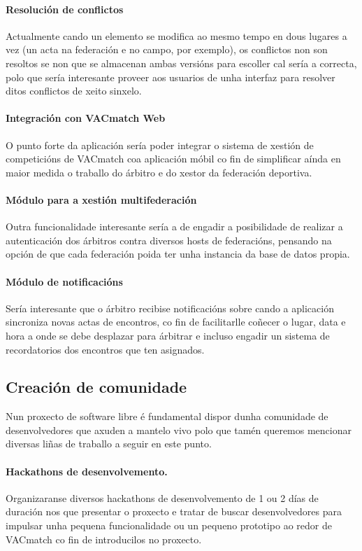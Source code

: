     \paragraph{Resolución de conflictos} Actualmente cando un elemento se 
modifica ao mesmo tempo en dous lugares a vez (un acta na federación e no 
campo, por exemplo), os conflictos non son resoltos se non que se almacenan 
ambas versións para escoller cal sería a correcta, polo que sería interesante 
proveer aos usuarios de unha interfaz para resolver ditos conflictos de xeito 
sinxelo.

    \paragraph{Integración con VACmatch Web} O punto forte da aplicación sería 
poder integrar o sistema de xestión de competicións de VACmatch coa aplicación 
móbil co fin de simplificar aínda en maior medida o traballo do árbitro e do 
xestor da federación deportiva. 

    \paragraph{Módulo para a xestión multifederación} Outra funcionalidade 
interesante sería a de engadir a posibilidade de realizar a autenticación dos 
árbitros contra diversos hosts de federacións, pensando na opción de que cada 
federación poida ter unha instancia da base de datos propia.

    \paragraph{Módulo de notificacións} Sería interesante que o árbitro 
recibise notificacións sobre cando a aplicación sincroniza novas actas de 
encontros, co fin de facilitarlle coñecer o lugar, data e hora a onde se debe 
desplazar para árbitrar e incluso engadir un sistema de recordatorios dos 
encontros que ten asignados.

  \subsection{Creación de comunidade}
  Nun proxecto de software libre é fundamental dispor dunha comunidade de 
desenvolvedores que axuden a mantelo vivo polo que tamén queremos mencionar 
diversas liñas de traballo a seguir en este punto.

    \paragraph{Hackathons de desenvolvemento.} Organizaranse diversos 
hackathons de desenvolvemento de 1 ou 2 días de duración nos que presentar o 
proxecto e tratar de buscar desenvolvedores para impulsar unha pequena 
funcionalidade ou un pequeno prototipo ao redor de VACmatch co fin de 
introducilos no proxecto.

